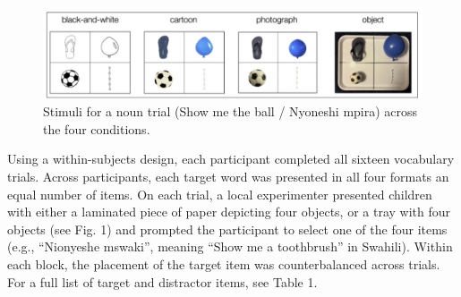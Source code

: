 \documentclass[10pt, letterpaper]{article}
\begin{document}
\begin{CodeChunk}
\begin{figure}[tb]

{\centering \includegraphics[width=6in]{fig1} 

}

\caption[Stimuli for a noun trial (Show me the ball / Nyoneshi mpira) across the four conditions]{Stimuli for a noun trial (Show me the ball / Nyoneshi mpira) across the four conditions.}\label{fig:figure1}
\end{figure}
\end{CodeChunk}

Using a within-subjects design, each participant completed all sixteen
vocabulary trials. Across participants, each target word was presented
in all four formats an equal number of items. On each trial, a local
experimenter presented children with either a laminated piece of paper
depicting four objects, or a tray with four objects (see Fig. 1) and
prompted the participant to select one of the four items (e.g.,
``Nionyeshe mswaki'', meaning ``Show me a toothbrush'' in Swahili).
Within each block, the placement of the target item was counterbalanced
across trials. For a full list of target and distractor items, see Table
1.
\end{document}
